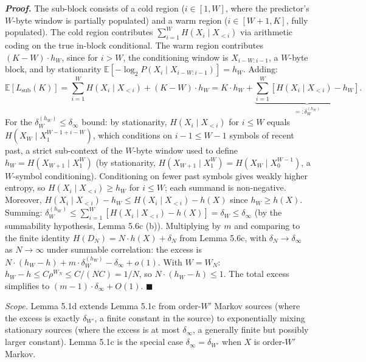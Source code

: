 \documentclass[
]{article}
\begin{document}
\emph{\textbf{Proof.}} The sub-block consists of a cold region
($i \in [1, W]$, where the predictor's $W$-byte window is partially
populated) and a warm region ($i \in [W+1, K]$, fully populated).
The cold region contributes $\sum_{i=1}^W H(X_i \mid X_{<i})$ via
arithmetic coding on the true in-block conditional. The warm region
contributes $(K - W) \cdot h_W$, since for $i > W$, the conditioning
window is $X_{i-W:i-1}$, a $W$-byte block, and by stationarity
$\mathbb{E}[-\log_2 P(X_i \mid X_{i-W:i-1})] = h_W$. Adding:
\[
\mathbb{E}[L_{\mathrm{sub}}(K)]
= \sum_{i=1}^W H(X_i \mid X_{<i}) + (K-W) \cdot h_W
= K \cdot h_W + \underbrace{\sum_{i=1}^W [H(X_i \mid X_{<i}) - h_W]}_{=: \delta_W^{(h_W)}}.
\]
For the $\delta_W^{(h_W)} \leq \delta_\infty$ bound: by stationarity,
$H(X_i \mid X_{<i})$ for $i \leq W$ equals $H(X_W \mid X_1^{W-1+i-W})$,
which conditions on $i-1 \leq W-1$ symbols of recent past, a strict
sub-context of the $W$-byte window used to define $h_W = H(X_{W+1}
\mid X_1^W)$ (by stationarity, $H(X_{W+1} \mid X_1^W) =
H(X_W \mid X_0^{W-1})$, a $W$-symbol conditioning). Conditioning on
fewer past symbols gives weakly higher entropy, so $H(X_i \mid X_{<i})
\geq h_W$ for $i \leq W$; each summand is non-negative.
Moreover, $H(X_i \mid X_{<i}) - h_W \leq H(X_i \mid X_{<i}) - h(X)$
since $h_W \geq h(X)$. Summing: $\delta_W^{(h_W)} \leq \sum_{i=1}^W
[H(X_i \mid X_{<i}) - h(X)] = \delta_W \leq \delta_\infty$ (by the
summability hypothesis, Lemma 5.6c (b)). Multiplying by $m$ and comparing to the finite identity
$H(D_N) = N \cdot h(X) + \delta_N$ from Lemma 5.6c, with
$\delta_N \to \delta_\infty$ as $N \to \infty$ under summable
correlation: the excess is $N \cdot (h_W - h) +
m \cdot \delta_W^{(h_W)} - \delta_\infty + o(1)$. With $W = W_N$:
$h_W - h \leq C \rho^{W_N} \leq C / (NC) = 1/N$, so $N \cdot (h_W -
h) \leq 1$. The total excess simplifies to $(m-1) \cdot \delta_\infty
+ O(1)$.
\hfill$\blacksquare$

\emph{Scope.} Lemma 5.1d extends Lemma 5.1c from order-$W'$ Markov
sources (where the excess is exactly $\delta_{W'}$, a finite constant
in the source) to exponentially mixing stationary sources (where the
excess is at most $\delta_\infty$, a generally finite but possibly
larger constant). Lemma 5.1c is the special case $\delta_\infty =
\delta_{W'}$ when $X$ is order-$W'$ Markov.
\end{document}
